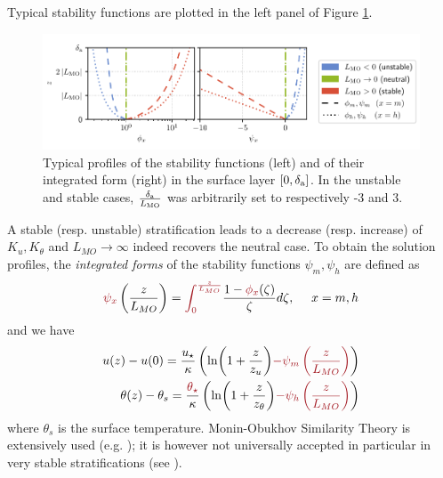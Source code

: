 Typical stability functions are plotted in the left panel of Figure
\ref{fig:airseaSCM_stabilityfunctions}.
\begin{figure}[h!]
	\centering
\includegraphics[scale=0.8]{images/stabilityfunctions.pdf}
	\caption{Typical profiles of the stability functions (left)
	and of their integrated form (right) in the
	surface layer $[0,\delta_{\rm a}]$. In the unstable
	and stable cases, $\frac{\delta_{\rm a}}{L_{\rm MO}}$
	was arbitrarily set to respectively -3 and 3.
	}
	\label{fig:airseaSCM_stabilityfunctions}
\end{figure}
A stable (resp. unstable) stratification leads to a
decrease (resp. increase) of $K_u, K_\theta$ and
$L_{MO}\rightarrow \infty$ indeed recovers the neutral case.
To obtain the solution profiles,
the \textit{integrated forms}
of the stability functions $\psi_m, \psi_h$
are defined as
\begin{equation}
	\emphase{\psi_x}\left(\frac{z}{L_{MO}}\right)
	= \emphase{\int_0^{\frac{z}{L_{MO}}}}
	\frac{1 - \emphase{\phi_x}(\zeta)}{\zeta} d\zeta
	, ~~~~x=m,h
\end{equation}
and we have
\begin{equation}
\label{eq:airseaSCM_MOSTprofiles}
\begin{aligned}
	u(z)-u(0) = \frac{u_\star}{\kappa}
    \left(
	\ln(1+\frac{z}{z_{u}})
	\emphase{- \psi_m\left(\frac{z}{L_{MO}}\right)}
    \right)
    \\
    \theta(z) - \theta_s = 
	\frac{\emphase{\theta_\star}}{\kappa}
    \left(
	\ln(1+\frac{z}{z_{\theta}})
	\emphase{- \psi_h\left(\frac{z}{L_{MO}}\right)}
\right)
\end{aligned}
\end{equation}
where $\theta_s$ is the surface temperature.
Monin-Obukhov Similarity Theory
is extensively used (e.g. \citep{basu_cautionary_2017});
it is however not universally
accepted in particular in very stable stratifications
(see \citep{optis_moving_2014}).
